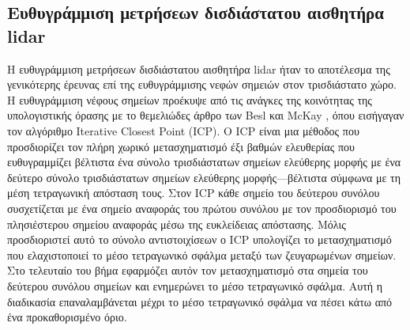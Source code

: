 \subsection{Ευθυγράμμιση μετρήσεων δισδιάστατου αισθητήρα lidar}

Η ευθυγράμμιση μετρήσεων δισδιάστατου αισθητήρα lidar ήταν το αποτέλεσμα της
γενικότερης έρευνας επί της ευθυγράμμισης νεφών σημειών στον τρισδιάστατο χώρο.
Η ευθυγράμμιση νέφους σημείων προέκυψε από τις ανάγκες της κοινότητας της
υπολογιστικής όρασης με το θεμελιώδες άρθρο των Besl και McKay
\cite{Besl1992c}, όπου εισήγαγαν τον αλγόριθμο Iterative Closest Point (ICP). Ο
ICP είναι μια μέθοδος που προσδιορίζει τον πλήρη χωρικό μετασχηματισμό έξι
βαθμών ελευθερίας που ευθυγραμμίζει βέλτιστα ένα σύνολο τρισδιάστατων σημείων
ελεύθερης μορφής με ένα δεύτερο σύνολο τρισδιάστατων σημείων ελεύθερης
μορφής---βέλτιστα σύμφωνα με τη μέση τετραγωνική απόσταση τους. Στον ICP κάθε
σημείο του δεύτερου συνόλου συσχετίζεται με ένα σημείο αναφοράς του πρώτου
συνόλου με τον προσδιορισμό του πλησιέστερου σημείου αναφοράς μέσω της
ευκλείδειας απόστασης. Μόλις προσδιοριστεί αυτό το σύνολο αντιστοιχίσεων ο ICP
υπολογίζει το μετασχηματισμό που ελαχιστοποιεί το μέσο τετραγωνικό σφάλμα
μεταξύ των ζευγαρωμένων σημείων.  Στο τελευταίο του βήμα εφαρμόζει αυτόν τον
μετασχηματισμό στα σημεία του δεύτερου συνόλου σημείων και ενημερώνει το μέσο
τετραγωνικό σφάλμα. Αυτή η διαδικασία επαναλαμβάνεται μέχρι το μέσο τετραγωνικό
σφάλμα να πέσει κάτω από ένα προκαθορισμένο όριο.

